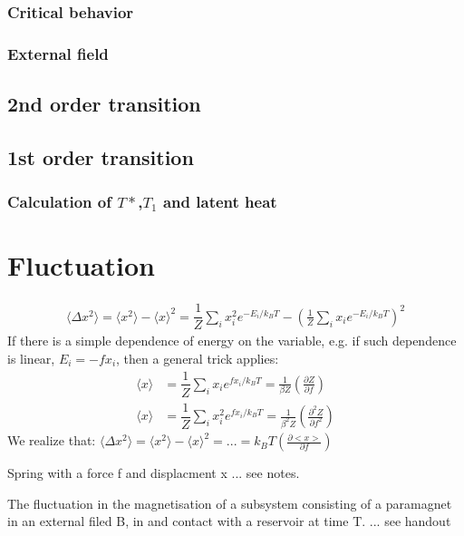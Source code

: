 \documentclass[12pt,a4paper]{article}
\begin{document}
\subsubsection{Critical behavior}
\subsubsection{External field}
\subsection{2nd order transition}
\subsection{1st order transition}
\subsubsection{Calculation of $T*$,$T_1$ and latent heat}
\section{Fluctuation}
\begin{align*}
    \langle \Delta x^2\rangle = \langle x^2\rangle -\langle x\rangle ^2 
    =\dfrac{1}{Z}\sum_i x_i^2 e^{-E_i/k_BT} - (\frac{1}{Z}\sum_i x_i e^{-E_i/k_BT})^2
\end{align*}
If there is a simple dependence of energy on the variable, 
e.g. if such dependence is linear, $E_i=-fx_i$, then a general trick applies:
\begin{align*}
    \langle x\rangle &= \dfrac{1}{Z}\sum_i x_i e^{fx_i/k_BT} = \frac{1}{\beta Z}(\frac{\partial Z}{\partial f})\\
    \langle x\rangle &= \dfrac{1}{Z}\sum_i x_i^2 e^{fx_i/k_BT} = \frac{1}{\beta^2 Z}(\frac{\partial^2 Z}{\partial f^2})
\end{align*}
We realize that:
$\langle \Delta x^2\rangle = \langle x^2\rangle -\langle x\rangle ^2 = ... = k_BT(\frac{\partial <x>}{\partial f})$\\
\begin{example}
    {Spring with a force f and displacment x}
    {... see notes.}
\end{example}
\begin{example}
    {The fluctuation in the magnetisation of a subsystem consisting of a paramagnet in an external filed B, in and contact with a reservoir at time T.}
    {... see handout}
\end{example}
\end{document}
